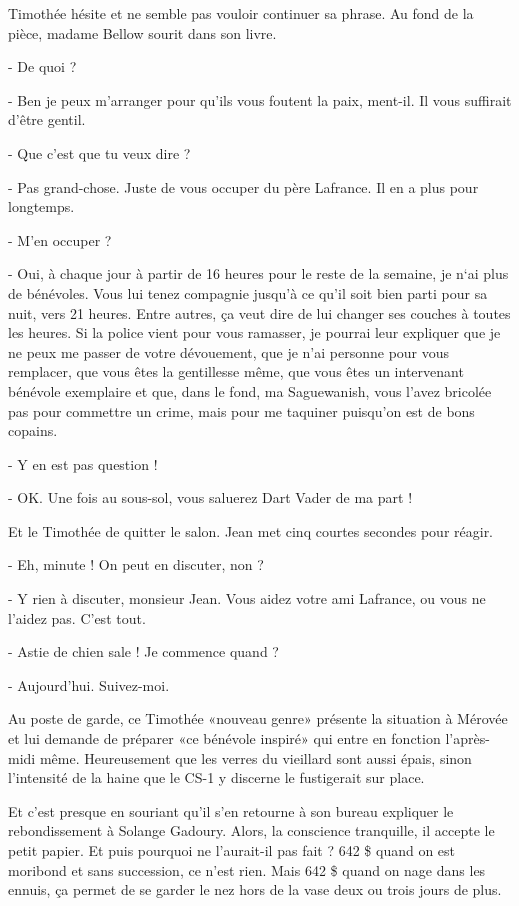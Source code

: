 Timothée hésite et ne semble pas vouloir continuer sa phrase. Au fond de la pièce, madame Bellow sourit dans son livre.

- De quoi ?

- Ben je peux m’arranger pour qu’ils vous foutent la paix, ment-il. Il vous suffirait d’être gentil.

- Que c’est que tu veux dire ?

- Pas grand-chose. Juste de vous occuper du père Lafrance. Il en a plus pour longtemps.

- M’en occuper ?

- Oui, à chaque jour à partir de 16 heures pour le reste de la semaine, je n‘ai plus de bénévoles. Vous lui tenez compagnie jusqu’à ce qu’il soit bien parti pour sa nuit, vers 21 heures. Entre autres, ça veut dire de lui changer ses couches à toutes les heures. Si la police vient pour vous ramasser, je pourrai leur expliquer que je ne peux me passer de votre dévouement, que je n’ai personne pour vous remplacer, que vous êtes la gentillesse même, que vous êtes un intervenant bénévole exemplaire et que, dans le fond, ma Saguewanish, vous l’avez bricolée pas pour commettre un crime, mais pour me taquiner puisqu’on est de bons copains.

- Y en est pas question !

- OK. Une fois au sous-sol, vous saluerez Dart Vader de ma part !

Et le Timothée de quitter le salon. Jean met cinq courtes secondes pour réagir.

- Eh, minute ! On peut en discuter, non ?

- Y rien à discuter, monsieur Jean. Vous aidez votre ami Lafrance, ou vous ne l’aidez pas. C’est tout.

- Astie de chien sale ! Je commence quand ?

- Aujourd’hui. Suivez-moi.

Au poste de garde, ce Timothée «nouveau genre» présente la situation à Mérovée et lui demande de préparer «ce bénévole inspiré» qui entre en fonction l’après-midi même. Heureusement que les verres du vieillard sont aussi épais, sinon l’intensité de la haine que le CS-1 y discerne le fustigerait sur place.

Et c’est presque en souriant qu’il s’en retourne à son bureau expliquer le rebondissement à Solange Gadoury. Alors, la conscience tranquille, il accepte le petit papier. Et puis pourquoi ne l’aurait-il pas fait ? 642 \$ quand on est moribond et sans succession, ce n’est rien. Mais 642 \$ quand on nage dans les ennuis, ça permet de se garder le nez hors de la vase deux ou trois jours de plus.

